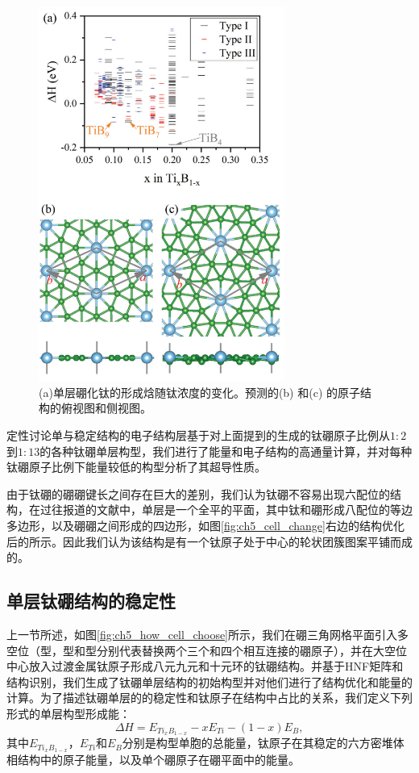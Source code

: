 \begin{figure}
  \includegraphics[width=0.72\textwidth]{figs/ch5_energy_hull.png}
  \centering
  \caption{(a)单层硼化钛的形成焓随钛浓度的变化。预测的(b) 和(c) 的原子结构的俯视图和侧视图。}
  \label{fig:ch5_energy_hull}
\end{figure}

定性讨论单与稳定结构的电子结构层基于对上面提到的生成的钛硼原子比例从$1:2$到$1:13$的各种钛硼单层构型，我们进行了能量和电子结构的高通量计算，并对每种钛硼原子比例下能量较低的构型分析了其超导性质。

由于钛硼的硼硼键长之间存在巨大的差别，我们认为钛硼不容易出现六配位的结构，在过往报道的文献中，单层是一个全平的平面，其中钛和硼形成八配位的等边多边形，以及硼硼之间形成的四边形，如图\ref{fig:ch5_cell_change}右边的结构优化后的所示。因此我们认为该结构是有一个钛原子处于中心的轮状团簇图案平铺而成的。

\subsection{单层钛硼结构的稳定性}

上一节所述，如图\ref{fig:ch5_how_cell_choose}所示，我们在硼三角网格平面引入多空位（型，型和型分别代表替换两个三个和四个相互连接的硼原子），并在大空位中心放入过渡金属钛原子形成八元九元和十元环的钛硼结构。并基于HNF矩阵和结构识别，我们生成了钛硼单层结构的初始构型并对他们进行了结构优化和能量的计算。为了描述钛硼单层的的稳定性和钛原子在结构中占比的关系，我们定义下列形式的单层构型形成能：
\begin{equation}
  \Delta H = E_{Ti_xB_{1-x}} - xE_{Ti} - (1-x)E_{B},
\end{equation}
其中$E_{Ti_xB_{1-x}}$，$E_{Ti}$和$E_B$分别是构型单胞的总能量，钛原子在其稳定的六方密堆体相结构中的原子能量，以及单个硼原子在硼平面中的能量。

